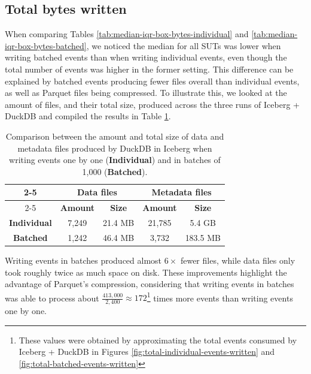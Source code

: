 \subsection{Total bytes written}\label{sec:total-bytes-written}
When comparing Tables \ref{tab:median-iqr-box-bytes-individual} and \ref{tab:median-iqr-box-bytes-batched}, we noticed the median for all SUTs was lower when writing batched events than when writing individual events, even though the total number of events was higher in the former setting. This difference can be explained by batched events producing fewer files overall than individual events, as well as Parquet files being compressed. To illustrate this, we looked at the amount of files, and their total size, produced across the three runs of Iceberg + DuckDB and compiled the results in Table \ref{tab:total-files-and-sizes-iceberg}. 


\begin{table}[h!]
	\centering
	\begin{tabular}{c|c|c||c|c|}
		\cline{2-5}
		\multirow{2}{*}{} &\multicolumn{2}{c||}{\textbf{Data files}} & \multicolumn{2}{c|}{\textbf{Metadata files}} \\
		\cline{2-5}
		&\textbf{Amount} & \textbf{Size} & \textbf{Amount} & \textbf{Size} \\
		\hline
		\multicolumn{1}{|c|}{\textbf{Individual}} & 7,249 & 21.4 MB & 21,785 & 5.4 GB \\
		\hline
		\multicolumn{1}{|c|}{\textbf{Batched}}& 1,242 & 46.4 MB & 3,732 & 183.5 MB \\
		\hline
	\end{tabular}
	\caption{Comparison between the amount and total size of data and metadata files produced by DuckDB in Iceberg when writing events one by one (\textbf{Individual}) and in batches of 1,000 (\textbf{Batched}).}
	\label{tab:total-files-and-sizes-iceberg}
\end{table}

Writing events in batches produced almost $6\times$ fewer files, while data files only took roughly twice as much space on disk. These improvements highlight the advantage of Parquet's compression, considering that writing events in batches was able to process about $\frac{413,000}{2,400}\approx172$\footnote{These values were obtained by approximating the total events consumed by Iceberg + DuckDB in Figures \ref{fig:total-individual-events-written} and \ref{fig:total-batched-events-written}} times more events than writing events one by one.

